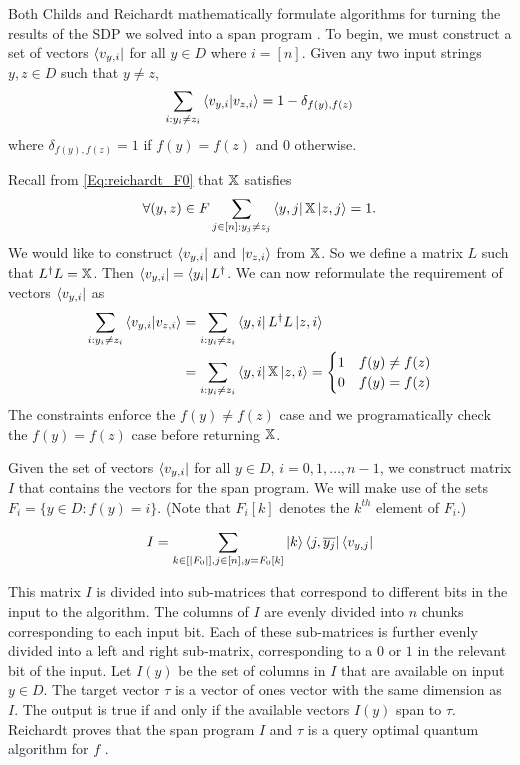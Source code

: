 Both Childs and Reichardt mathematically formulate
algorithms for turning the results of the SDP we solved
into a span program \cite{reichardt2009span, childs}.
To begin, we must construct a set of vectors
$\bra{v_{y,i}}$ for all $y \in D$ where $i = [n]$.
Given any two input strings $y, z \in D$ such that $y\neq z$,
\begin{align}
    \sum_{i: y_i \ne z_i} \braket{v_{y,i}|v_{z,i}} = 1 - \delta_{f(y), f(z)} \nonumber
\end{align}
where $\delta_{f(y), f(z)} = 1$ if $f(y) = f(z)$ and $0$ otherwise.

Recall from \cref{Eq:reichardt_F0} that $\operatorname{\mathbb{X}}$ satisfies
\begin{align}
    \forall (y,z) \in F \sum_{j \in [n]: y_j \ne z_j} 
    \bra{y,j} \operatorname{\mathbb{X}} \ket{z, j} = 1 \nonumber.
\end{align}
We would like to construct $\bra{v_{y,i}}$ and $\ket{v_{z,i}}$
from $\operatorname{\mathbb{X}}$.
So we define a matrix $L$ such that $L^\dagger L = \operatorname{\mathbb{X}}$.
Then $\bra{v_{y,i}} = \bra{y_i}L^\dagger$.
We can now reformulate the requirement of vectors $\bra{v_{y,i}}$
as
\begin{align}
    \sum_{i: y_i \ne z_i} \braket{v_{y,i}|v_{z,i}} &= \sum_{i: y_i \ne z_i}
    \bra{y,i} L^\dagger L \ket{z, i} \nonumber \\
    &= \sum_{i: y_i \ne z_i} \bra{y,i} \operatorname{\mathbb{X}} \ket{z, i} = \begin{cases}
        1 & f(y) \ne f(z) \\
        0 & f(y) = f(z)
    \end{cases} \nonumber 
\end{align}
The constraints enforce the $f(y) \neq f(z)$ case and we programatically
check the $f(y) = f(z)$ case before returning $\operatorname{\mathbb{X}}$.

Given the set of vectors $\bra{v_{y,i}}$ for all $y \in
D$, $i = 0, 1, \ldots , n-1$, we construct 
matrix $I$ that contains the vectors for the span
program. We will make use of the sets $F_i =
\{y \in D: f(y) = i\}$.
(Note that $F_i[k]$ denotes the $k^{th}$ element of $F_i$.)

\begin{align}\label{input_vectors}
    I = \sum_{k \in [|F_0|], j \in [n], y = F_0[k]}
    \ket{k}\bra{j, \overline{y_j}} \bra{v_{y,j}}
\end{align}

This matrix $I$ is divided into sub-matrices that
correspond to different bits in the input to the
algorithm.
The columns of $I$ are evenly divided into
$n$ chunks corresponding to each input bit.
Each of these sub-matrices is further evenly divided into a left and
right sub-matrix, corresponding to a $0$ or $1$
in the relevant bit of the input.
Let $I(y)$ be the set of columns in 
$I$ that are available on input $y \in D$.
The target vector $\tau$ 
is a vector of ones vector with the same 
dimension as $I$.
The output is true if and only if the available
vectors $I(y)$ span to $\tau$.
Reichardt proves that the span program $I$ 
and $\tau$ is a query optimal 
quantum algorithm for $f$ \cite{reichardt2009span}.
